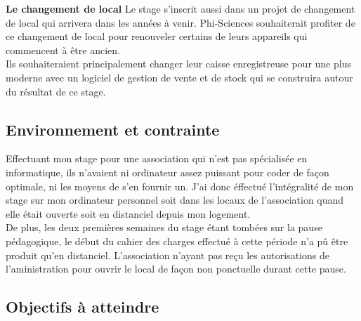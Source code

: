 \documentclass[11pt, twoside]{article}
\begin{document}
\vspace*{0.2cm}
{\large\textbf{Le changement de local}}
Le stage s'inscrit aussi dans un projet de changement de local qui arrivera dans les années à venir. Phi-Sciences souhaiterait profiter de ce changement de local pour renouveler certains de leurs appareils qui commencent à être ancien.\\
Ils souhaiteraient principalement changer leur caisse enregistreuse pour une plus moderne avec un logiciel de gestion de vente et de stock qui se construira autour du résultat de ce stage.

\subsection{Environnement et contrainte}
Effectuant mon stage pour une association qui n'est pas spécialisée en informatique, ils n'avaient ni ordinateur assez puissant pour coder de façon optimale, ni les moyens de s'en fournir un.
J'ai donc éffectué l'intégralité de mon stage sur mon ordinateur personnel soit dans les locaux de l'association quand elle était ouverte soit en distanciel depuis mon logement.\\
De plus, les deux premières semaines du stage étant tombées sur la pause pédagogique, le début du cahier des charges effectué à cette période n'a pû être produit qu'en distanciel.
L'association n'ayant pas reçu les autorisations de l'aministration pour ouvrir le local de façon non ponctuelle durant cette pause.




\subsection{Objectifs à atteindre}
\end{document}
